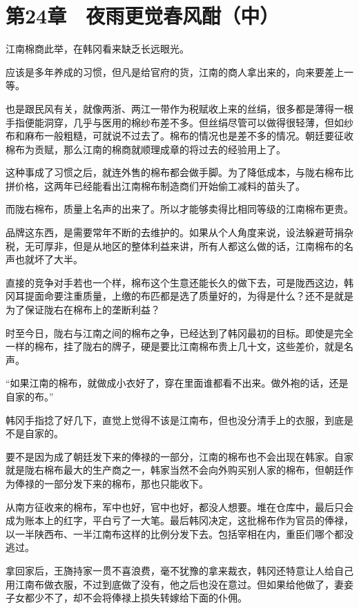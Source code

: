 \section{第24章　夜雨更觉春风酣（中）}

江南棉商此举，在韩冈看来缺乏长远眼光。

应该是多年养成的习惯，但凡是给官府的货，江南的商人拿出来的，向来要差上一等。

也是跟民风有关，就像两浙、两江一带作为税赋收上来的丝绢，很多都是薄得一根手指便能洞穿，几乎与医用的棉纱布差不多。但丝绢尽管可以做得很轻薄，但如纱布和麻布一般粗糙，可就说不过去了。棉布的情况也是差不多的情况。朝廷要征收棉布为贡赋，那么江南的棉商就顺理成章的将过去的经验用上了。

这种事成了习惯之后，就连外售的棉布都会做手脚。为了降低成本，与陇右棉布比拼价格，这两年已经能看出江南棉布制造商们开始偷工减料的苗头了。

而陇右棉布，质量上名声的出来了。所以才能够卖得比相同等级的江南棉布更贵。

品牌这东西，是需要常年不断的去维护的。如果从个人角度来说，设法躲避苛捐杂税，无可厚非，但是从地区的整体利益来讲，所有人都这么做的话，江南棉布的名声也就坏了大半。

直接的竞争对手若也一个样，棉布这个生意还能长久的做下去，可是陇西这边，韩冈耳提面命要注重质量，上缴的布匹都是选了质量好的，为得是什么？还不是就是为了保证陇右在棉布上的垄断利益？

时至今日，陇右与江南之间的棉布之争，已经达到了韩冈最初的目标。即使是完全一样的棉布，挂了陇右的牌子，硬是要比江南棉布贵上几十文，这些差价，就是名声。

“如果江南的棉布，就做成小衣好了，穿在里面谁都看不出来。做外袍的话，还是自家的布。”

韩冈手指捻了好几下，直觉上觉得不该是江南布，但也没分清手上的衣服，到底是不是自家的。

要不是因为成了朝廷发下来的俸禄的一部分，江南的棉布也不会出现在韩家。自家就是陇右棉布最大的生产商之一，韩家当然不会向外购买别人家的棉布，但朝廷作为俸禄的一部分发下来的棉布，那也只能收下。

从南方征收来的棉布，军中也好，官中也好，都没人想要。堆在仓库中，最后只会成为账本上的红字，平白亏了一大笔。最后韩冈决定，这批棉布作为官员的俸禄，以一半陕西布、一半江南布这样的比例分发下去。包括宰相在内，重臣们哪个都没逃过。

拿回家后，王旖持家一贯不喜浪费，毫不犹豫的拿来裁衣，韩冈还特意让人给自己用江南布做衣服，不过到底做了没有，他之后也没在意过。但如果给他做了，妻妾子女都少不了，却不会将俸禄上损失转嫁给下面的仆佣。

